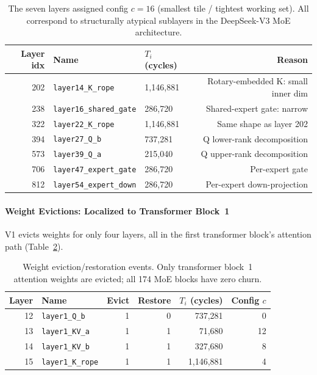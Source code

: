 \begin{table}[h]
\centering
\caption{The seven layers assigned config $c=16$ (smallest tile /
tightest working set). All correspond to structurally atypical sublayers
in the DeepSeek-V3 MoE architecture.}
\label{tab:ds_outliers}
\begin{tabular}{rllr}
\toprule
\textbf{Layer idx} & \textbf{Name} &
\textbf{$T_i$ (cycles)} & \textbf{Reason} \\
\midrule
202 & \texttt{layer14\_K\_rope}      & 1{,}146{,}881 & Rotary-embedded K: small inner dim \\
238 & \texttt{layer16\_shared\_gate} &   286{,}720   & Shared-expert gate: narrow \\
322 & \texttt{layer22\_K\_rope}      & 1{,}146{,}881 & Same shape as layer 202 \\
394 & \texttt{layer27\_Q\_b}         &   737{,}281   & Q lower-rank decomposition \\
573 & \texttt{layer39\_Q\_a}         &   215{,}040   & Q upper-rank decomposition \\
706 & \texttt{layer47\_expert\_gate} &   286{,}720   & Per-expert gate \\
812 & \texttt{layer54\_expert\_down} &   286{,}720   & Per-expert down-projection \\
\bottomrule
\end{tabular}
\end{table}

\paragraph{Weight Evictions: Localized to Transformer Block~1}

V1 evicts weights for only four layers, all in the first transformer block's attention path (Table~\ref{tab:ds_evictions}).

\begin{table}[h]
\centering
\caption{Weight eviction/restoration events. Only transformer block~1
attention weights are evicted; all 174 MoE blocks have zero churn.}
\label{tab:ds_evictions}
\begin{tabular}{rlrrrr}
\toprule
\textbf{Layer} & \textbf{Name} &
\textbf{Evict} & \textbf{Restore} &
\textbf{$T_i$ (cycles)} & \textbf{Config $c$} \\
\midrule
12 & \texttt{layer1\_Q\_b}   & 1 & 0 & 737{,}281   & 0  \\
13 & \texttt{layer1\_KV\_a}  & 1 & 1 &  71{,}680   & 12 \\
14 & \texttt{layer1\_KV\_b}  & 1 & 1 & 327{,}680   &  8 \\
15 & \texttt{layer1\_K\_rope}& 1 & 1 & 1{,}146{,}881 & 4 \\
\bottomrule
\end{tabular}
\end{table}

